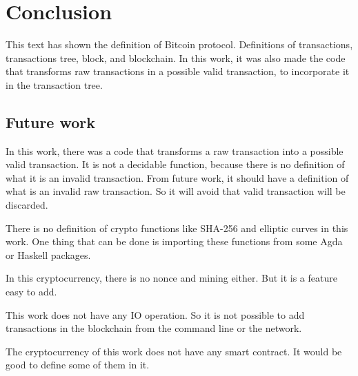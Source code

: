 \section{Conclusion}

This text has shown the definition of Bitcoin protocol.
Definitions of transactions, transactions tree, block, and blockchain.
In this work, it was also made the code that transforms raw transactions in a possible valid transaction,
to incorporate it in the transaction tree.

\subsection{Future work}

In this work, there was a code that transforms a raw transaction into a possible valid transaction.
It is not a decidable function, because there is no definition of what it is an invalid transaction.
From future work, it should have a definition of what is an invalid raw transaction.
So it will avoid that valid transaction will be discarded. 

There is no definition of crypto functions like SHA-256 and elliptic curves in this work.
One thing that can be done is importing these functions from some Agda or Haskell packages.

In this cryptocurrency, there is no nonce and mining either.
But it is a feature easy to add.

This work does not have any IO operation.
So it is not possible to add transactions in the blockchain from the command line or the network.

The cryptocurrency of this work does not have any smart contract.
It would be good to define some of them in it.
